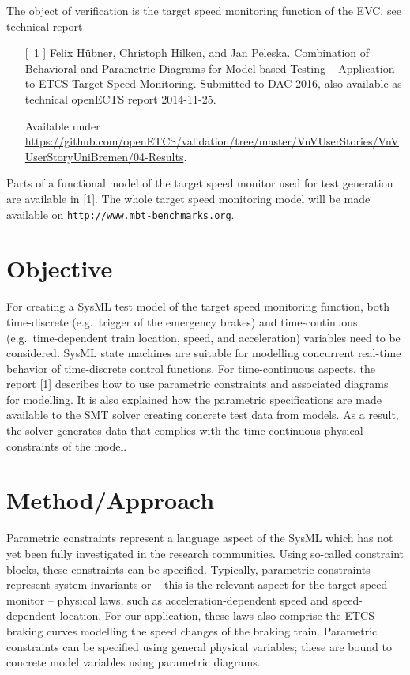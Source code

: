The object of verification is the target speed monitoring function of the EVC,
see technical report
\begin{itemize}
\item[[~1]] Felix H{\"u}bner, Christoph Hilken, and Jan Peleska.
  Combination of Behavioral and Parametric Diagrams for Model-based
  Testing -- Application to ETCS Target Speed Monitoring. Submitted
  to DAC 2016, also available as technical openECTS report 2014-11-25.

Available under  \url{https://github.com/openETCS/validation/tree/master/VnVUserStories/VnVUserStoryUniBremen/04-Results}.
\end{itemize}

Parts of a functional model of the target speed monitor used for test
generation are available in [1]. The whole target speed monitoring
model will be made available on {\tt http://www.mbt-benchmarks.org}.

\section{Objective}
For creating a SysML test model of the target speed monitoring
function, both time-discrete (e.g.~trigger of the emergency brakes)
and time-continuous (e.g.~time-dependent train location, speed, and
acceleration) variables need to be considered. SysML state machines
are suitable for modelling concurrent real-time behavior of
time-discrete control functions. For time-continuous aspects, the
report [1] describes how to use parametric constraints and associated
diagrams for modelling. It is also explained how the parametric
specifications are made available to the SMT solver creating concrete
test data from models. As a result, the solver generates data that
complies with the time-continuous physical constraints of the model.


\section{Method/Approach}

Parametric constraints represent a language aspect of the SysML which
has not yet been fully investigated in the research communities. Using
so-called constraint blocks, these constraints can be
specified. Typically, parametric constraints represent system
invariants or -- this is the relevant aspect for the target speed
monitor -- physical laws, such as acceleration-dependent speed and
speed-dependent location.  For our application, these laws also
comprise the ETCS braking curves modelling the speed changes of the
braking train.  Parametric constraints can be specified using general
physical variables; these are bound to concrete model variables using
parametric diagrams.

